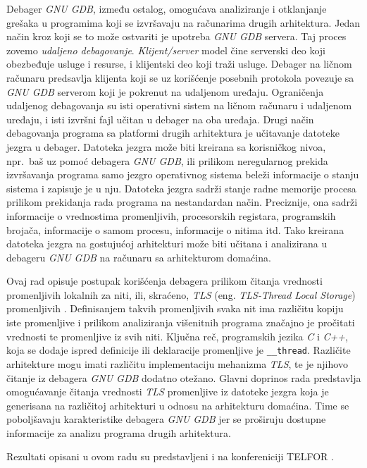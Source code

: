 \documentclass[12pt,oneside]{memoir}
\begin{document}
Debager \emph{GNU GDB}, između ostalog, omogućava analiziranje i otklanjanje grešaka u programima koji se izvršavaju na računarima drugih arhitektura. Jedan način kroz koji se to može ostvariti je upotreba \emph{GNU GDB} servera. Taj proces zovemo \emph{udaljeno debagovanje}. \emph{Klijent/server} model čine serverski deo koji obezbeđuje usluge i resurse, i klijentski deo koji traži usluge. Debager na ličnom računaru predsavlja klijenta koji se uz korišćenje posebnih protokola povezuje sa \emph{GNU GDB} serverom koji je pokrenut na udaljenom uređaju. Ograničenja udaljenog debagovanja su isti operativni sistem na ličnom računaru i udaljenom uređaju, i isti izvršni fajl učitan u debager na oba uređaja. Drugi način debagovanja programa sa platformi drugih arhitektura je učitavanje datoteke jezgra u debager. Datoteka jezgra može biti kreirana sa korisničkog nivoa, npr.~baš uz pomoć debagera \emph{GNU GDB}, ili prilikom neregularnog prekida izvršavanja programa samo jezgro operativnog sistema beleži informacije o stanju sistema i zapisuje je u nju. Datoteka jezgra sadrži stanje radne memorije procesa prilikom prekidanja rada programa na nestandardan način. Preciznije, ona sadrži informacije o vrednostima promenljivih, procesorskih registara, programskih brojača, informacije o samom procesu, informacije o nitima itd. Tako kreirana datoteka jezgra na gostujućoj arhitekturi može biti učitana i analizirana u debageru \emph{GNU GDB} na računaru sa arhitekturom domaćina.

Ovaj rad opisuje postupak korišćenja debagera prilikom čitanja vrednosti promenljivih lokalnih za niti, ili, skraćeno, \emph{TLS} (eng. \emph{TLS-Thread Local Storage}) promenljivih \cite{TLS}. Definisanjem takvih promenljivih svaka nit ima različitu kopiju iste promenljive i prilikom analiziranja višenitnih programa značajno je pročitati vrednosti te promenljive iz svih niti. Ključna reč, programskih jezika \emph{C} i \emph{C++}, koja se dodaje ispred definicije ili deklaracije promenljive je \texttt{\_\_thread}. Različite arhitekture mogu imati različitu implementaciju mehanizma \emph{TLS}, te je njihovo čitanje iz debagera \emph{GNU GDB} dodatno otežano.
Glavni doprinos rada predstavlja omogućavanje čitanja vrednosti \emph{TLS} promenljive iz datoteke jezgra koja je generisana na različitoj arhitekturi u odnosu na arhitekturu domaćina. Time se poboljšavaju karakteristike debagera \emph{GNU GDB} jer se proširuju dostupne informacije za analizu programa drugih arhitektura.

Rezultati opisani u ovom radu su predstavljeni i na konfereniciji TELFOR \cite{TELFOR}.
\end{document}
